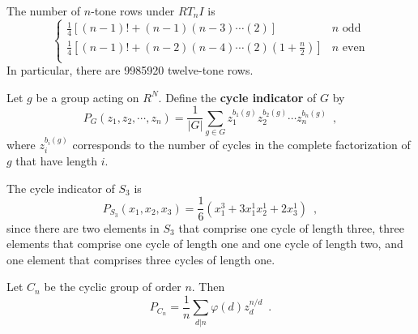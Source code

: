 \begin{corollary}
	\cite[54]{Reiner1985}
	\cite[127]{FripertingerLackner2015}
	The number of $n$-tone rows under $RT_nI$ is
	\begin{equation}
		\begin{cases}
			\frac{1}{4} \left[ (n - 1)! + (n - 1) (n - 3) \cdots (2) \right]
			& n \text{ odd} \\
			\frac{1}{4} \left[ (n - 1)! + (n - 2) (n - 4) \cdots (2) (1 + \frac{n}{2})
			\right] & n \text{ even} \\
		\end{cases}
	\end{equation}
	In particular, there are 9985920 twelve-tone rows.
\end{corollary}

\begin{definition}
	\cite[87]{Aigner2007}
	Let $g$ be a group acting on $R^N$. Define the \textbf{cycle indicator} of $G$ by
	\begin{equation}
		P_G(z_1, z_2, \cdots, z_n) = \frac{1}{|G|} \sum_{g \in G} z_1^{b_1(g)} z_2^{b_2(g)}
		\cdots z_n^{b_n(g)} \enspace,
	\end{equation}
	where $z_i^{b_i(g)}$ corresponds to the number of cycles in the complete factorization
	of $g$ that have length $i$.
\end{definition}

\begin{example}
	The cycle indicator of $S_3$ is
	\begin{equation}
		P_{S_3}(x_1, x_2, x_3) = \frac{1}{6}(x_1^3 + 3 x_1^1 x_2^1 + 2 x_3^1) \enspace,
	\end{equation}
	since there are two elements in $S_3$ that comprise one cycle of length three,
	three elements that comprise one cycle of length one and one cycle of length two,
	and one element that comprises three cycles of length one.
\end{example}

\begin{example}
	Let $C_n$ be the cyclic group of order $n$. Then
	\begin{equation}
		P_{C_n} = \frac{1}{n} \sum_{d | n} \varphi(d) z_d^{n / d} \enspace.
	\end{equation}
\end{example}

